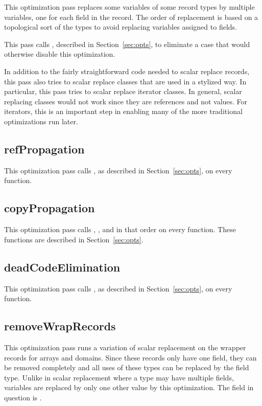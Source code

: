 \documentclass[10pt]{article}
\begin{document}
This optimization pass replaces some variables of some record types by
multiple variables, one for each field in the record.  The order of
replacement is based on a topological sort of the types to avoid
replacing variables assigned to fields.

This pass calls , described in
Section~\ref{sec:opts}, to eliminate a case that would otherwise
disable this optimization.

In addition to the fairly straightforward code needed to scalar
replace records, this pass also tries to scalar replace classes that
are used in a stylized way.  In particular, this pass tries to scalar
replace iterator classes.  In general, scalar replacing classes would
not work since they are references and not values.  For iterators,
this is an important step in enabling many of the more traditional
optimizations run later.

\subsection{refPropagation}

This optimization pass calls , as
described in Section~\ref{sec:opts}, on every function.

\subsection{copyPropagation}

This optimization pass calls ,
, and  in that
order on every function.  These functions are described in
Section~\ref{sec:opts}.

\subsection{deadCodeElimination}

This optimization pass calls , as described in
Section~\ref{sec:opts}, on every function.

\subsection{removeWrapRecords}

This optimization pass runs a variation of scalar replacement on the
wrapper records for arrays and domains.  Since these records only have
one field, they can be removed completely and all uses of these types
can be replaced by the field type.  Unlike in scalar replacement where
a type may have multiple fields, variables are replaced by only one
other value by this optimization.  The field in question is
.
\end{document}
